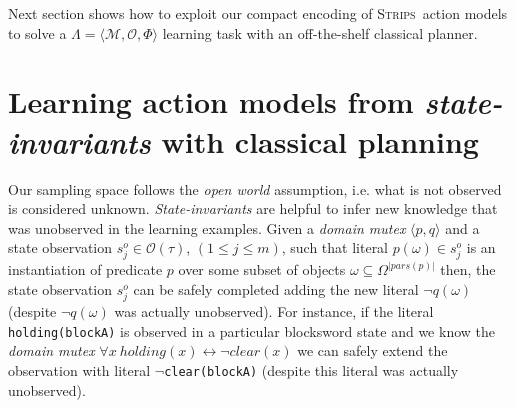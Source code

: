 \documentclass{article}
\newcommand{\tup}[1]{{\langle #1 \rangle}}
\newcommand{\strips}{\textsc{Strips}}
\begin{document}
Next section shows how to exploit our compact encoding of \strips\ action models to solve a $\Lambda=\tup{\mathcal{M},{\mathcal O},\Phi}$ learning task with an off-the-shelf classical planner.



\section{Learning action models from {\em state-invariants} with classical planning}
\label{sec:compilation}


Our sampling space follows the {\em open world} assumption, i.e. what is not observed is considered unknown. {\em State-invariants} are helpful to infer new knowledge that was unobserved in the learning examples. Given a {\em domain mutex} $\tup{p,q}$ and a state observation $s_j^o\in \mathcal{O}(\tau)$, {\small $(1\leq j\leq m)$}, such that literal $p(\omega)\in s_j^o$ is an instantiation of predicate $p$ over some subset of objects $\omega\subseteq\Omega^{|pars(p)|}$ then, the state observation $s_j^o$ can be safely completed adding the new literal $\neg q(\omega)$ (despite $\neg q(\omega)$ was actually unobserved). For instance, if the literal {\tt\small holding(blockA)} is observed in a particular blocksword state and we know the {\em domain mutex} $\forall x\ holding(x)\leftrightarrow\neg clear(x)$ we can safely extend the observation with literal {\tt\small $\neg$clear(blockA)} (despite this literal was actually unobserved). 
\end{document}
